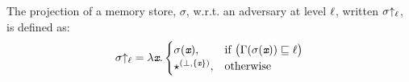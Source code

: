 \begin{mydef}
\label{def:lir:msp}
The projection of a memory store, $\sigma$, w.r.t. an adversary at
level $\ell$, written $\sigma{\uparrow_\ell}$, is defined as:
\begin{align*}
\sigma{\uparrow_\ell} = \lambda \emph{\texttt{x}}. 
\begin{cases}
\sigma(\emph{\texttt{x}}), &\text{if} ~ \big(\Gamma(\sigma(\emph{\texttt{x}})) \sqsubseteq \ell\big) \\
\star^{(\bot,\{\emph{\texttt{x}}\})}, &\text{otherwise}
\end{cases}
\end{align*}
\end{mydef}

